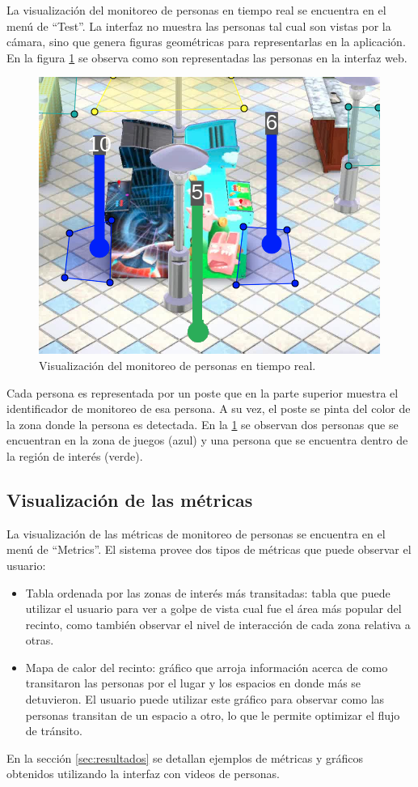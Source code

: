 La visualización del monitoreo de personas en tiempo real se encuentra en el menú de ``Test''. La interfaz no muestra las personas tal cual son vistas por la cámara, sino que genera figuras geométricas para representarlas en la aplicación. En la figura \ref{fig:visualizacionSeguimiento} se observa como son representadas las personas en la interfaz web.

\begin{figure}[ht]
	\centering
	\includegraphics[scale=.8]{./Figures/visualizacionSeguimiento.png}
	\caption{Visualización del monitoreo de personas en tiempo real.}
	\label{fig:visualizacionSeguimiento}
\end{figure}

Cada persona es representada por un poste que en la parte superior muestra el identificador de monitoreo de esa persona. A su vez, el poste se pinta del color de la zona donde la persona es detectada. En la \ref{fig:visualizacionSeguimiento} se observan dos personas que se encuentran en la zona de juegos (azul) y una persona que se encuentra dentro de la región de interés (verde).

\subsection{Visualización de las métricas}

La visualización de las métricas de monitoreo de personas se encuentra en el menú de ``Metrics''. El sistema provee dos tipos de métricas que puede observar el usuario:

\begin{itemize}
\item Tabla ordenada por las zonas de interés más transitadas: tabla que puede utilizar el usuario para ver a golpe de vista cual fue el área más popular del recinto, como también observar el nivel de interacción de cada zona relativa a otras.
\item Mapa de calor del recinto: gráfico que arroja información acerca de como transitaron las personas por el lugar y los espacios en donde más se detuvieron. El usuario puede utilizar este gráfico para observar como las personas transitan de un espacio a otro, lo que le permite optimizar el flujo de tránsito.
\end{itemize}

En la sección \ref{sec:resultados} se detallan ejemplos de métricas y gráficos obtenidos utilizando la interfaz con videos de personas.